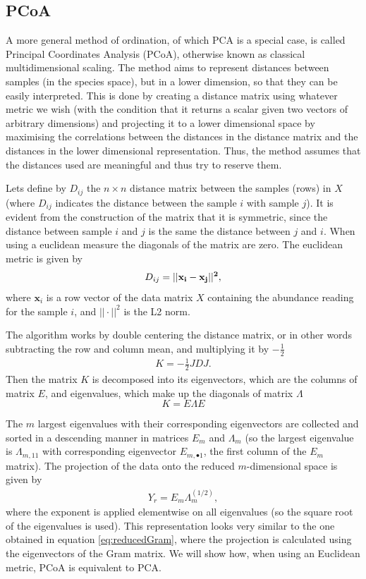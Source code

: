 \subsection{PCoA}
A more general method of ordination, of which PCA is a special case, is called Principal Coordinates Analysis (PCoA), otherwise known as classical multidimensional scaling. The method aims to represent distances between samples (in the species space), but in a lower dimension, so that they can be easily interpreted. This is done by creating a distance matrix using whatever metric we wish (with the condition that it returns a scalar given two vectors of arbitrary dimensions) and projecting it to a lower dimensional space by maximising the correlations between the distances in the distance matrix and the distances in the lower dimensional representation. Thus, the method assumes that the distances used are meaningful and thus try to reserve them.

Lets define by $D_{ij}$ the $n \times n$ distance matrix between the samples (rows) in $X$ (where $D_{ij}$ indicates the distance between the sample $i$ with sample $j$). It is evident from the construction of the matrix that it is symmetric, since the distance between sample $i$ and $j$ is the same the distance between $j$ and $i$. When using a euclidean measure the diagonals of the matrix are zero. The euclidean metric is given by
\begin{align}
D_{ij} = {||\bf{x}_i- \mathbf{x}_j||^2},
\label{eq:euclideanmetric}
\end{align}
where $ \mathbf{x}_i$ is a row vector of the data matrix $X$ containing the abundance reading for the sample $i$, and $||\cdot||^2$ is the L2 norm.

The algorithm works by double centering the distance matrix, or in other words subtracting the row and column mean, and multiplying it by $-\frac{1}{2}$
\begin{align}
\label{eq:Kmatrix}
K = -\frac{1}{2}JDJ.
\end{align}
Then the matrix $K$ is decomposed into its eigenvectors, which are the columns of matrix $E$, and eigenvalues, which make up the diagonals of matrix $\Lambda$
\begin{equation}
    K = E\Lambda E
\end{equation}

The $m$ largest eigenvalues with their corresponding eigenvectors are collected and sorted in a descending manner in matrices $E_m$ and $\Lambda_m$ (so the largest eigenvalue is $\Lambda_{m,11}$ with corresponding eigenvector $E_{m,{ \bullet}1}$, the first column of the $E_m$ matrix). The projection of the data onto the reduced $m$-dimensional space is given by
\begin{align}
Y_r = E_m \Lambda_m^{(1/2)},
\end{align}
where the exponent is applied elementwise on all eigenvalues (so the square root of the eigenvalues is used). This representation looks very similar to the one obtained in equation \ref{eq:reducedGram}, where the projection is calculated using the eigenvectors of the Gram matrix. We will show how, when using an Euclidean metric, PCoA is equivalent to PCA.

